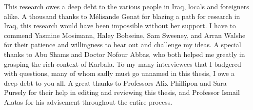This research owes a deep debt to the various people in Iraq, locals and foreigners alike. A thousand thanks to Mélisande Genat for blazing a path for research in Iraq, this research would have been impossible without her support. I have to commend Yasmine Mosimann, Haley Bobseine, Sam Sweeney, and Arran Walshe for their patience and willingness to hear out and challenge my ideas. A special thanks to Abu Shams and Doctor Nofour Abbas, who both helped me greatly in grasping the rich context of Karbala. To my many interviewees that I badgered with questions, many of whom sadly must go unnamed in this thesis, I owe a deep debt to you all. A great thanks to Professors Alix Phillipon and Sara Pursely for their help in editing and reviewing this thesis, and Professor Ismail Alatas for his advisement throughout the entire process. 